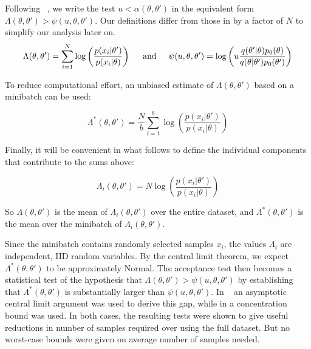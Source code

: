 \documentclass{article}
\begin{document}
Following ~\cite{icml2014c1_bardenet14}, we write the test $u < \alpha(\theta,\theta')$ in
the equivalent form $\Lambda(\theta,\theta') > \psi(u,\theta,\theta')$. Our definitions differ
from those in \cite{icml2014c1_bardenet14} by a factor of $N$ to simplify our analysis later on. 
\begin{equation}
\Lambda(\theta,\theta') = \sum_{i=1}^N \log\left(\frac{p(x_i|\theta')}{p(x_i|\theta)}\right)  
\hspace{0.2in} {\rm and} \hspace{0.2in}
\psi(u,\theta,\theta') = \log\left(u\frac{q(\theta'|\theta)p_0(\theta)}{q(\theta|\theta')p_0(\theta')}\right)
\end{equation}

To reduce computational effort, an unbiased estimate of $\Lambda(\theta,\theta')$
based on a minibatch can be used:

\begin{equation}
\Lambda^*(\theta,\theta') = \frac{N}{b}\sum_{i=1}^b \log\left(\frac{p(x_i|\theta')}{p(x_i|\theta)}\right)  
\end{equation}

Finally, it will be convenient in what follows to define the individual components that
contribute to the sums above:

\begin{equation}\label{eq:individual_terms}
\Lambda_i(\theta,\theta') = N \log\left(\frac{p(x_i|\theta')}{p(x_i|\theta)}\right)  
\end{equation}

So $\Lambda(\theta,\theta')$ is the mean of $\Lambda_i(\theta,\theta')$ over the
entire dataset, and $\Lambda^*(\theta,\theta')$ is the mean over the minibatch
of $\Lambda_i(\theta,\theta')$. 

Since the minibatch contains randomly selected samples $x_i$, the
values $\Lambda_i$ are independent, IID random variables.  By the central
limit theorem, we expect $\Lambda^*(\theta,\theta')$ to be
approximately Normal.  The acceptance test then becomes a statistical
test of the hypothesis that $\Lambda(\theta,\theta') >
\psi(u,\theta,\theta')$ by establishing that
$\Lambda^*(\theta,\theta')$ is substantially larger than
$\psi(u,\theta,\theta')$.  In ~\cite{cutting_mh_2014} an asymptotic
central limit argument was used to derive this gap, while in
\cite{icml2014c1_bardenet14} a concentration bound was used. In both
cases, the resulting tests were shown to give useful reductions in
number of samples required over using the full dataset. But no
worst-case bounds were given on average number of samples needed.
\end{document}
